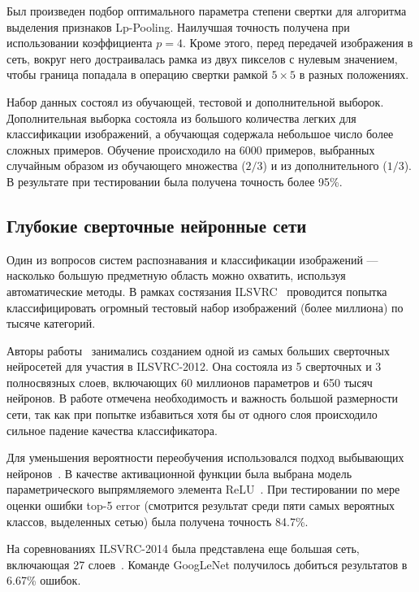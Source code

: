 \documentclass[a4paper,14pt]{extarticle} %
\begin{document}
Был произведен подбор оптимального параметра степени свертки для алгоритма выделения признаков Lp-Pooling. Наилучшая точность получена при использовании коэффициента $p=4$. Кроме этого, перед передачей изображения в сеть, вокруг него достраивалась рамка из двух пикселов с нулевым значением, чтобы граница попадала в операцию свертки рамкой $5 \times 5$ в разных положениях.

Набор данных состоял из обучающей, тестовой и дополнительной выборок. Дополнительная выборка состояла из большого количества легких для классификации изображений, а обучающая содержала небольшое число более сложных примеров. Обучение происходило на 6000 примеров, выбранных случайным образом из обучающего множества ($2/3$) и из дополнительного ($1/3$). В результате при тестировании была получена точность более 95\%.

\subsection{Глубокие сверточные нейронные сети}
\hspace{\parindent} Один из вопросов систем распознавания и классификации изображений --- насколько большую предметную область можно охватить, используя автоматические методы. В рамках состязания ILSVRC~\cite{ILSVRC} проводится попытка классифицировать огромный тестовый набор изображений (более миллиона) по тысяче категорий.

Авторы работы~\cite{krizhevsky2012imagenet} занимались созданием одной из самых больших сверточных нейросетей для участия в ILSVRC-2012. Она состояла из 5 сверточных и 3 полносвязных слоев, включающих 60 миллионов параметров и 650 тысяч нейронов. В работе отмечена необходимость и важность большой размерности сети, так как при попытке избавиться хотя бы от одного слоя происходило сильное падение качества классификатора. 

Для уменьшения вероятности переобучения использовался подход выбывающих нейронов~\cite{srivastava2014dropout}. В качестве активационной функции была выбрана модель параметрического выпрямляемого элемента ReLU~\cite{dahl2013improving}. При тестировании по мере оценки ошибки top-5 error (смотрится результат среди пяти самых вероятных классов, выделенных сетью) была получена точность 84.7\%.

На соревнованиях ILSVRC-2014 была представлена еще большая сеть, включающая 27 слоев~\cite{szegedy2014going}. Команде GoogLeNet получилось добиться результатов в 6.67\% ошибок.
\end{document}
